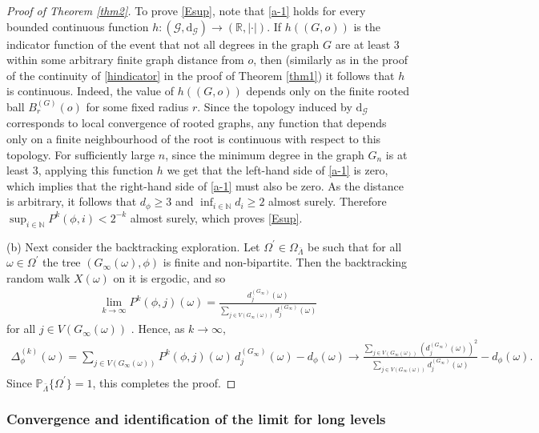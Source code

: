 \documentclass[11pt]{article}
\numberwithin{equation}{section}
\theoremstyle{plain}
\renewcommand{\P}{\mathbb P}
\begin{document}
\begin{proof}[Proof of Theorem \ref{thm2}]
To prove \eqref{Esup}, note that \eqref{a-1} holds for every bounded continuous function $h\colon (\mathscr{G}, \mathrm{d}_{\mathscr{G}}) \to (\mathbb{R}, |\cdot|)$. If $h((G,o))$ is the indicator function of the event that not all degrees in the graph $G$ are at least 3 within some arbitrary finite graph distance from $o$, then (similarly as in the proof of the continuity of \eqref{hindicator} in the proof of Theorem \ref{thm1})  it follows that $h$ is continuous. 
Indeed, the value of $h((G,o))$ depends only on the finite rooted ball $B_r^{(G)}(o)$ for some fixed radius $r$. 
Since the topology induced by $\mathrm{d}_{\mathscr{G}}$ corresponds to local convergence of rooted graphs, any function that depends only on a finite neighbourhood of the root is continuous with respect to this topology. For sufficiently large $n$, since the minimum degree in the graph $G_n$ is at least 3, applying this function $h$ we get that the left-hand side of \eqref{a-1} is zero, which implies that the right-hand side of \eqref{a-1} must also be zero. As the distance is arbitrary, it follows that $d_\phi \geq 3$ and $\inf_{i \in \mathbb{N}} d_i \geq 2$ almost surely. Therefore $\sup_{i \in \mathbb{N}} P^k(\phi, i) < 2^{-k}$ almost surely, which proves \eqref{Esup}.

\medskip\noindent
(b) 
Next consider the backtracking exploration. Let $\Omega^{\prime}\in \Omega_{\bar{\Lambda}}$ be such that for all $\omega\in \Omega^{\prime}$ the tree $(G_{\infty}(\omega),\phi)$ is finite and non-bipartite. Then the backtracking random walk $X(\omega)$ on it is ergodic, and so
\begin{align*}
\lim_{k\rightarrow\infty}P^{k}(\phi,j)(\omega) = 
\frac{d_{j}^{(G_{\infty})}(\omega)}{\sum_{j\in V(G_{\infty}(\omega))}d_{j}^{(G_{\infty})}(\omega)}
\end{align*}
for all $j\in V(G_{\infty}(\omega))$ \cite[Theorem 1.8.3]{N}. Hence, as $k\to\infty$,
\begin{align*}
\Delta_{\phi}^{(k)}(\omega)=\sum_{j\in V(G_{\infty}(\omega))} P^{k}(\phi, j)(\omega)\, 
d^{(G_\infty)}_{j}(\omega)-d_{\phi}(\omega)\to \frac{\sum_{j\in V(G_{\infty}(\omega))}
(d_{j}^{(G_{\infty})}(\omega))^2}{\sum_{j\in V(G_{\infty}(\omega))}d_{j}^{(G_{\infty})}(\omega)}
-d_{\phi}(\omega).
\end{align*}
Since $\P_{\bar{\Lambda}}\{\Omega^{\prime}\}=1$, this completes the proof.
\end{proof}


\subsubsection{Convergence and identification of the limit for long levels}
\end{document}
